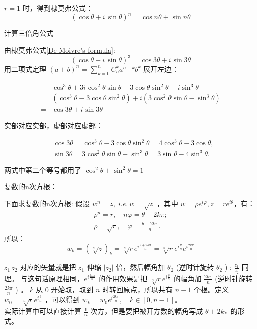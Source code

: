 \documentclass[cn,hazy,blue,14pt,normal]{elegantnote}
\numberwithin{equation}{section}
\begin{document}
$r=1$ 时，得到棣莫弗公式：
\begin{equation}\label{De Moivre's formula}
(\cos\theta+i\,\sin\theta)^n=\cos n\theta+\sin n\theta
\end{equation}
\begin{example}
	计算三倍角公式
\end{example}
由棣莫弗公式\ref{De Moivre's formula}:
 $$
(\cos\theta+i\,\sin\theta)^3=\cos 3\theta+i\sin3\theta
$$
\indent 用二项式定理 $(a + b)^n = \sum\limits_{k=0}^{n} C_{n}^{k} a^{n-k} b^k$ 展开左边：

\begin{align}
	&\cos^3\theta+3i\cos^2\theta\sin\theta-3\cos\theta\sin^2\theta-i\sin^3\theta
 	\\
	=&(\cos^3\theta-3\cos\theta\sin^2\theta)+i(3\cos^2\theta\sin\theta-\sin^3\theta)
	\\
	=&\cos 3\theta+i\sin3\theta
\end{align}

实部对应实部，虚部对应虚部：

\begin{align}
 	&\cos 3\theta=\cos^3\theta-3\cos\theta\sin^2\theta=4\cos^3\theta-3\cos\theta,
	\\
	&\sin3\theta=3\cos^2\theta\sin\theta-\sin^3\theta=3\sin\theta-4\sin^3\theta.
\end{align}

\begin{note}
	两式中第二个等号都用了 $\cos^2\theta+\sin^2\theta=1$
\end{note}
\begin{definition}
	复数的n次方根：
\end{definition}
下面求复数的n次方根:
假设 $w^n=z,\;i.e.\ w=\sqrt{z}$ ，其中 $w=\rho e^{i\varphi},z=re^{i\theta}$​ ，有：
\begin{gather}
	\rho^n=r,\quad n\varphi=\theta+2k\pi;\\
\rho=\sqrt{r},\quad \varphi=\frac{\theta+2k\pi}{n}.
\end{gather}
所以：
$$
w_k=(\sqrt[n]{z})_k=\sqrt[n]{r}e^{i\frac{\theta+2k\pi}{n}}=\sqrt[n]{r}e^{i\frac{\theta}{n}}e^{i\frac{2k\pi}{n}}
$$
\begin{note}
	$z_1\,z_2$ 对应的矢量就是把 $z_1$ 伸缩 $|z_2|$ 倍，然后幅角加 $\theta_2$ (逆时针旋转 $\theta_2$ ) ; $\frac{z_1}{z_2}$ 同理。
与这句话原理相同，$e^{i\frac{2k\pi}{n}}$ 的作用效果是把 $\sqrt[n]{r}e^{i\frac{\theta}{n}}$ 的幅角加 $\frac{2k\pi}{n}$ (逆时针旋转 $\frac{2k\pi}{n}$ ) 。
$k$ 从 $0$ 开始取，取到 $n$ 时转回原点，所以共有 $n-1$ 个根。定义 $w_0=\sqrt[n]{r}e^{i\frac{\theta}{n}}$ ，可以得到 $w_k=w_0e^{i\frac{2k\pi}{n}},\quad k\in[0,n-1]$​。\\
实际计算中可以直接计算 $\frac{1}{n}$ 次方，但是要把被开方数的幅角写成 $\theta+2k\pi$ 的形式。
\end{note}
\end{document}
